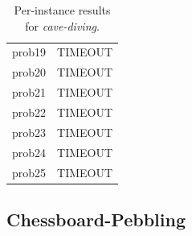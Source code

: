 \begin{table}[H]
{\begin{tabular}{lrrr rr rr rr rrrrr}
            prob19           & \multicolumn{14}{c}{TIMEOUT}                                                                                                                                 \\
            prob20           & \multicolumn{14}{c}{TIMEOUT}                                                                                                                                 \\
            prob21           & \multicolumn{14}{c}{TIMEOUT}                                                                                                                                 \\
            prob22           & \multicolumn{14}{c}{TIMEOUT}                                                                                                                                 \\
            prob23           & \multicolumn{14}{c}{TIMEOUT}                                                                                                                                 \\
            prob24           & \multicolumn{14}{c}{TIMEOUT}                                                                                                                                 \\
            prob25           & \multicolumn{14}{c}{TIMEOUT}                                                                                                                                 \\
            \bottomrule
        \end{tabular}%
    }
    \caption{Per-instance results for \textit{cave-diving}.}
    \label{tab:appendix_cavediving}
\end{table}

\subsection{Chessboard-Pebbling}
\label{app:results_chesspebbling}

